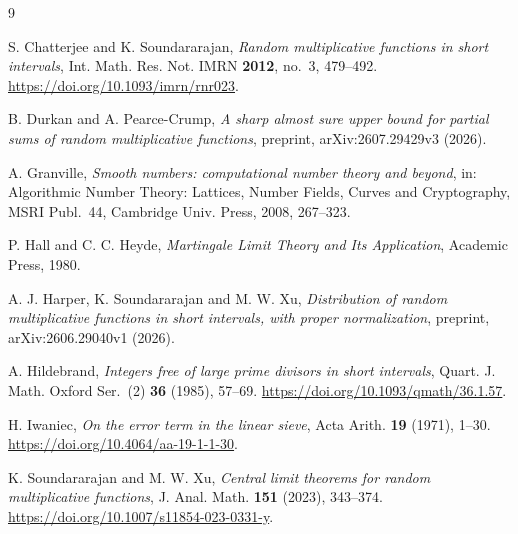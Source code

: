 \documentclass[11pt]{amsart}
\theoremstyle{remark}
\numberwithin{equation}{section}
\begin{document}
\begin{thebibliography}{9}

 S. Chatterjee and K. Soundararajan, \emph{Random multiplicative functions in short intervals}, Int. Math. Res. Not. IMRN \textbf{2012}, no.~3, 479--492. \url{https://doi.org/10.1093/imrn/rnr023}.

 B. Durkan and A. Pearce-Crump, \emph{A sharp almost sure upper bound for partial sums of random multiplicative functions}, preprint, arXiv:2607.29429v3 (2026).

 A. Granville, \emph{Smooth numbers: computational number theory and beyond}, in: Algorithmic Number Theory: Lattices, Number Fields, Curves and Cryptography, MSRI Publ.~44, Cambridge Univ. Press, 2008, 267--323.

 P. Hall and C. C. Heyde, \emph{Martingale Limit Theory and Its Application}, Academic Press, 1980.

 A. J. Harper, K. Soundararajan and M. W. Xu, \emph{Distribution of random multiplicative functions in short intervals, with proper normalization}, preprint, arXiv:2606.29040v1 (2026).

 A. Hildebrand, \emph{Integers free of large prime divisors in short intervals}, Quart. J. Math. Oxford Ser.~(2) \textbf{36} (1985), 57--69. \url{https://doi.org/10.1093/qmath/36.1.57}.

 H. Iwaniec, \emph{On the error term in the linear sieve}, Acta Arith. \textbf{19} (1971), 1--30. \url{https://doi.org/10.4064/aa-19-1-1-30}.

 K. Soundararajan and M. W. Xu, \emph{Central limit theorems for random multiplicative functions}, J. Anal. Math. \textbf{151} (2023), 343--374. \url{https://doi.org/10.1007/s11854-023-0331-y}.

\end{thebibliography}
\end{document}
